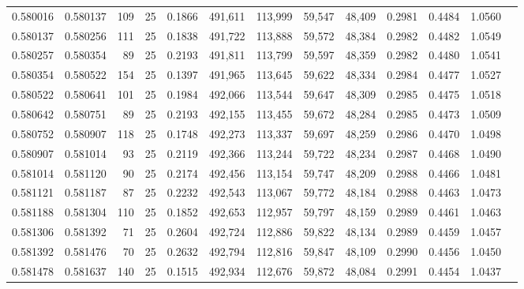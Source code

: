 \begin{tabular}{rrrrrrrrrrrrr}
0.580016 & 0.580137 &   109 &  25 &                                     0.1866 & 491,611 & 113,999 &  59,547 &  48,409 & 0.2981 & 0.4484 & 1.0560 \\
0.580137 & 0.580256 &   111 &  25 &                                     0.1838 & 491,722 & 113,888 &  59,572 &  48,384 & 0.2982 & 0.4482 & 1.0549 \\
0.580257 & 0.580354 &    89 &  25 &                                     0.2193 & 491,811 & 113,799 &  59,597 &  48,359 & 0.2982 & 0.4480 & 1.0541 \\
0.580354 & 0.580522 &   154 &  25 &                                     0.1397 & 491,965 & 113,645 &  59,622 &  48,334 & 0.2984 & 0.4477 & 1.0527 \\
0.580522 & 0.580641 &   101 &  25 &                                     0.1984 & 492,066 & 113,544 &  59,647 &  48,309 & 0.2985 & 0.4475 & 1.0518 \\
0.580642 & 0.580751 &    89 &  25 &                                     0.2193 & 492,155 & 113,455 &  59,672 &  48,284 & 0.2985 & 0.4473 & 1.0509 \\
0.580752 & 0.580907 &   118 &  25 &                                     0.1748 & 492,273 & 113,337 &  59,697 &  48,259 & 0.2986 & 0.4470 & 1.0498 \\
0.580907 & 0.581014 &    93 &  25 &                                     0.2119 & 492,366 & 113,244 &  59,722 &  48,234 & 0.2987 & 0.4468 & 1.0490 \\
0.581014 & 0.581120 &    90 &  25 &                                     0.2174 & 492,456 & 113,154 &  59,747 &  48,209 & 0.2988 & 0.4466 & 1.0481 \\
0.581121 & 0.581187 &    87 &  25 &                                     0.2232 & 492,543 & 113,067 &  59,772 &  48,184 & 0.2988 & 0.4463 & 1.0473 \\
0.581188 & 0.581304 &   110 &  25 &                                     0.1852 & 492,653 & 112,957 &  59,797 &  48,159 & 0.2989 & 0.4461 & 1.0463 \\
0.581306 & 0.581392 &    71 &  25 &                                     0.2604 & 492,724 & 112,886 &  59,822 &  48,134 & 0.2989 & 0.4459 & 1.0457 \\
0.581392 & 0.581476 &    70 &  25 &                                     0.2632 & 492,794 & 112,816 &  59,847 &  48,109 & 0.2990 & 0.4456 & 1.0450 \\
0.581478 & 0.581637 &   140 &  25 &                                     0.1515 & 492,934 & 112,676 &  59,872 &  48,084 & 0.2991 & 0.4454 & 1.0437 \\

\end{tabular}
